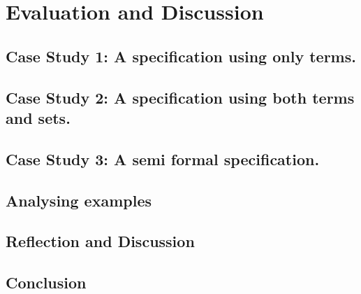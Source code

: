 \chapter{Evaluation and Discussion}
\label{ch:evaluation}



\section{Case Study 1: A specification using only terms.}

\section{Case Study 2: A specification using both terms and sets.}

\section{Case Study 3: A semi formal specification.}

\section{Analysing examples}

\section{Reflection and Discussion}

\section{Conclusion}